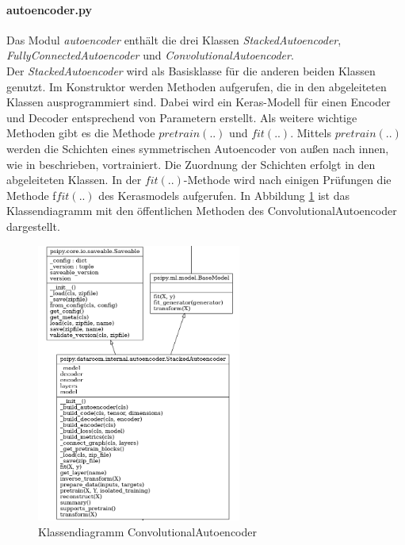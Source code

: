 	\paragraph{autoencoder.py} Das Modul \textit{autoencoder} enthält die drei Klassen \textit{StackedAutoencoder}, \textit{FullyConnectedAutoencoder} und \textit{ConvolutionalAutoencoder}. \\	
	Der \textit{StackedAutoencoder} wird als Basisklasse für die anderen beiden Klassen genutzt. Im Konstruktor werden Methoden aufgerufen, die in den abgeleiteten Klassen ausprogrammiert sind. Dabei wird ein Keras-Modell für einen Encoder und Decoder entsprechend von Parametern erstellt. Als weitere wichtige Methoden gibt es die Methode $pretrain(..)$ und $fit(..)$. Mittels $pretrain(..)$ werden die Schichten eines symmetrischen Autoencoder von außen nach innen, wie in \cite{Bengio.2007} beschrieben, vortrainiert. Die Zuordnung der Schichten erfolgt in den abgeleiteten Klassen.
	In der $fit(..)$-Methode wird nach einigen Prüfungen die Methode f$fit(..)$ \cite{Chollet.2015} des Kerasmodels aufgerufen. In Abbildung \ref{img:KlassendiagrammConvolutionalAutoencoder} ist das Klassendiagramm mit den öffentlichen Methoden des ConvolutionalAutoencoder dargestellt. 
	\begin{figure}[h]
		\centering
		\includegraphics[width=0.6\textwidth, center]{bilder/Klassendiagramme/klassendiagramm_public_cae2.png}
		\caption[Klassendiagramm ConvolutionalAutoencoder]{Klassendiagramm ConvolutionalAutoencoder}
		\label{img:KlassendiagrammConvolutionalAutoencoder}
	\end{figure}  
	
